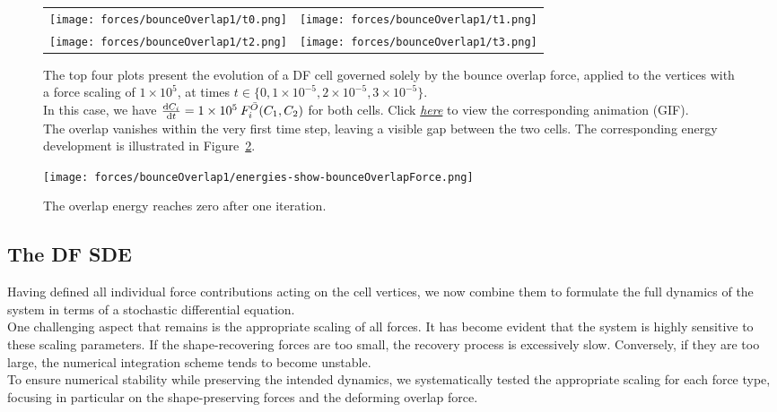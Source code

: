 \begin{figure}[h!]
    \centering
    \begin{tabular}{cc}
        \texttt{[image: forces/bounceOverlap1/t0.png]} &
        \texttt{[image: forces/bounceOverlap1/t1.png]} \\
        \texttt{[image: forces/bounceOverlap1/t2.png]} &
        \texttt{[image: forces/bounceOverlap1/t3.png]} \\
    \end{tabular}
    \caption{The top four plots present the evolution of a DF cell governed solely by the bounce overlap force, applied to the vertices with a force scaling of $1\times 10^{5}$, at times $t \in \{0, 1\times 10^{-5}, 2\times 10^{-5}, 3\times 10^{-5}\}$.\\
			In this case, we have $\frac{\mathrm{d} C_i}{\mathrm{d} t} = 1\times 10^{5} \: F_i^{\bar{O}}(C_1, C_2)$ for both cells.
			Click \href{https://github.com/tivo476c/FlexibleCellModel/blob/master/figures/gifs/showForces/show-bounceOverlapForce.gif}{\textit{here}} to view the corresponding animation (GIF).\\
			The overlap vanishes within the very first time step, leaving a visible gap between the two cells. 
			The corresponding energy development is illustrated in Figure~\ref{fig:bounceOverlapEnergyDiagram}.
		}
	\label{fig:bounceOverlapForce}   
\end{figure}
\begin{figure}[h!]
    \centering
        \texttt{[image: forces/bounceOverlap1/energies-show-bounceOverlapForce.png]} 
    \caption{The overlap energy reaches zero after one iteration.}
	\label{fig:bounceOverlapEnergyDiagram}    
\end{figure}




\subsection{The DF SDE}
Having defined all individual force contributions acting on the cell vertices, we now combine them to formulate the full dynamics of the system in terms of a stochastic differential equation. \\
One challenging aspect that remains is the appropriate scaling of all forces.
It has become evident that the system is highly sensitive to these scaling parameters. 
If the shape-recovering forces are too small, the recovery process is excessively slow. 
Conversely, if they are too large, the numerical integration scheme tends to become unstable. \\ 
To ensure numerical stability while preserving the intended dynamics, we systematically tested the appropriate scaling for each force type, focusing in particular on the shape-preserving forces and the deforming overlap force.


